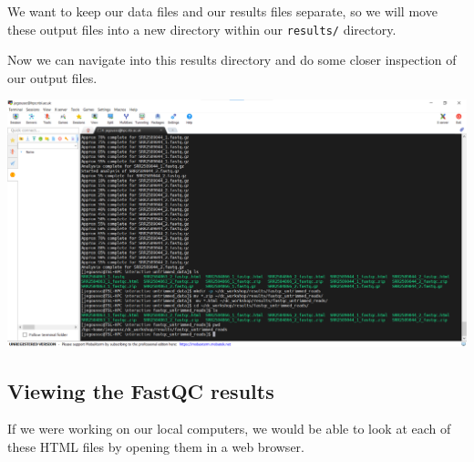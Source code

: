 \documentclass[
  letterpaper,
  DIV=11,
  numbers=noendperiod]{scrreprt}
\newenvironment{Shaded}{\begin{snugshade}}{\end{snugshade}}
\newcommand{\AttributeTok}[1]{\textcolor[rgb]{0.40,0.45,0.13}{#1}}
\newcommand{\ExtensionTok}[1]{\textcolor[rgb]{0.00,0.23,0.31}{#1}}
\newcommand{\NormalTok}[1]{\textcolor[rgb]{0.00,0.23,0.31}{#1}}
\newcommand{\PreprocessorTok}[1]{\textcolor[rgb]{0.68,0.00,0.00}{#1}}
\begin{document}
We want to keep our data files and our results files separate, so we
will move these output files into a new directory within our
\texttt{results/} directory.

\begin{Shaded}
\end{Shaded}

Now we can navigate into this results directory and do some closer
inspection of our output files.

\begin{Shaded}
\end{Shaded}

\includegraphics{images/fastqc-output.png}

\hypertarget{viewing-the-fastqc-results}{%
\subsection{Viewing the FastQC
results}\label{viewing-the-fastqc-results}}

If we were working on our local computers, we would be able to look at
each of these HTML files by opening them in a web browser.
\end{document}
